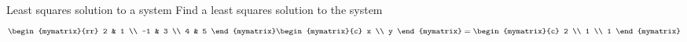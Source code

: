 \begin{example}{Least squares solution to a system}{}
Find a least squares solution to the system
\begin{equation*}
\begin{mymatrix}{rr}
2 & 1 \\
-1 & 3 \\
4 & 5
\end{mymatrix} \begin{mymatrix}{c}
x \\
y
\end{mymatrix} =\begin{mymatrix}{c}
2 \\
1 \\
1
\end{mymatrix}
\end{equation*}
\end{example}

